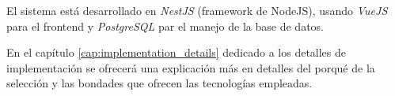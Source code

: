 El sistema está desarrollado en \textit{NestJS} (framework de NodeJS), usando \textit{VueJS} para el frontend y \textit{PostgreSQL} par el manejo de la base de datos.

En el capítulo \ref{cap:implementation_details} dedicado a los detalles de implementación se ofrecerá una explicación más en detalles del porqué de la selección y las bondades que ofrecen las tecnologías empleadas.

%
%
%
%
%
